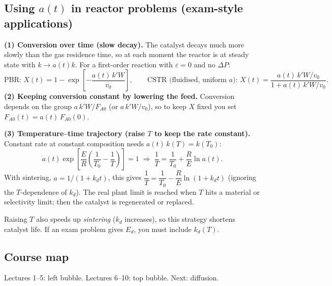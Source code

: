 \documentclass[11pt]{article}
\begin{document}
\subsection{Using $a(t)$ in reactor problems (exam-style applications)}
\textbf{(1) Conversion over time (slow decay).} The catalyst decays much more slowly than the gas residence time, so at each
moment the reactor is at steady state with $k\to a(t)k$. For a first-order reaction with $\varepsilon=0$ and no $\Delta P$:
\[
\text{PBR: } X(t)=1-\exp\!\left[-\frac{a(t)\,k'W}{v_0}\right],\qquad
\text{CSTR (fluidised, uniform $a$): } X(t)=\frac{a(t)\,k'W/v_0}{1+a(t)\,k'W/v_0}.
\]
\textbf{(2) Keeping conversion constant by lowering the feed.} Conversion depends on the group $a\,k'W/F_{A0}$ (or $a\,k'W/v_0$),
so to keep $X$ fixed you set $F_{A0}(t)=a(t)\,F_{A0}(0)$.

\textbf{(3) Temperature--time trajectory (raise $T$ to keep the rate constant).} Constant rate at constant composition
needs $a(t)\,k(T)=k(T_0)$:
\[
a(t)\exp\!\left[\frac{E}{R}\left(\frac{1}{T_0}-\frac{1}{T}\right)\right]=1
\;\Rightarrow\;
\frac{1}{T}=\frac{1}{T_0}+\frac{R}{E}\ln a(t).
\]
With sintering, $a=1/(1+k_dt)$, this gives $\dfrac1T=\dfrac{1}{T_0}-\dfrac{R}{E}\ln(1+k_dt)$ (ignoring the $T$-dependence of $k_d$).
The real plant limit is reached when $T$ hits a material or selectivity limit; then the catalyst is regenerated or replaced.
\begin{mistake}
Raising $T$ also speeds up \emph{sintering} ($k_d$ increases), so this strategy shortens catalyst life.
If an exam problem gives $E_d$, you must include $k_d(T)$.
\end{mistake}

\subsection{Course map}
\begin{center}

{\small Lectures 1--5: left bubble. Lectures 6--10: top bubble. Next: diffusion.}
\end{center}
\end{document}
